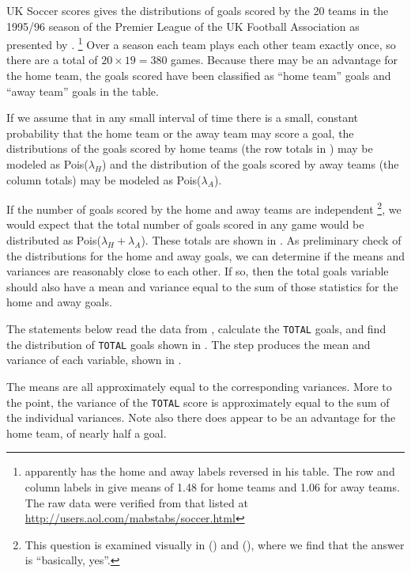\begin{Example}[soccer]{UK Soccer scores}
  gives the distributions of goals scored by
the 20 teams in the  1995/96 season of the
 Premier League of the UK Football Association
as presented by
\citet{Lee:97}.%
\footnote{\citet[p. 16]{Lee:97} apparently has the home and away labels reversed in
his table.
The row and column labels in  give means of 1.48
for home teams and 1.06 for away teams.  The raw data were verified
from that listed at \url{http://users.aol.com/mabstabs/soccer.html}}
Over a season
each team plays each other team exactly once, so there are a total of
$20 \times 19 = 380$ games.
Because there may be an advantage for the home team,
the goals scored have been classified as ``home team'' goals
and ``away team'' goals in the table.


If we assume that in any small interval of time there is a small, constant
probability that the home team or the away team may score a goal,
the distributions of the goals scored by home teams
(the row totals in )
may be modeled as Pois($\lambda_H$) and the distribution of
the goals scored by away teams (the column totals)
may be modeled as Pois($\lambda_A$).

If the number of goals scored by the home and away teams are independent%
\footnote{This question
is examined visually in  ()
and  (), where we find that the answer
is ``basically, yes''.},
we would expect that the total number of goals scored in any
game would be distributed as Pois($\lambda_H + \lambda_A$).
These totals are shown in .
As preliminary check of the distributions for the home and away goals,
we can determine if the means and variances are reasonably close
to each other.
If so, then the total goals variable should also have a mean and variance
equal to the sum of those statistics for the home and away goals.


The statements below read the data from , calculate
the \texttt{TOTAL} goals, and find the distribution of \texttt{TOTAL} goals
shown in .  The  step produces the
mean and variance of each variable, shown in .


\begin{Output}[htb]
\caption{UK Soccer data, assessing Poissonness}\label{out:soccer1.2}
\small

\end{Output}
The means are all approximately equal to the corresponding variances.
More to the point, the variance of the \texttt{TOTAL} score
is approximately equal to the sum of the individual variances.
Note also there does appear to be an advantage for the home team,
of nearly half a goal.
\end{Example}

